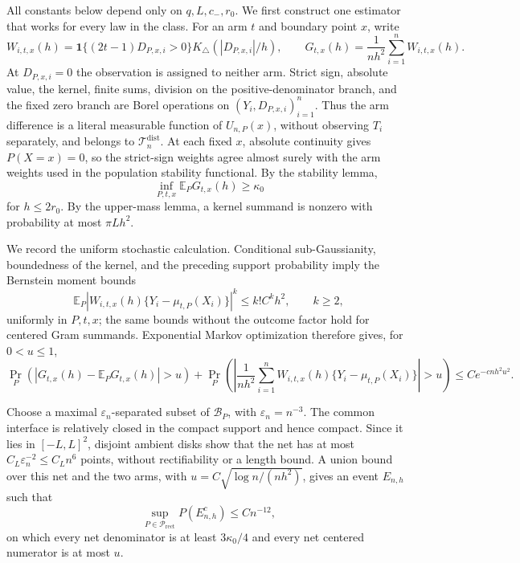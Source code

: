 All constants below depend only on \(q,L,c_-,r_0\).  We first construct one estimator that works for every law in the class.  For an arm \(t\) and boundary point \(x\), write
\[
W_{i,t,x}(h)=\mathbf1\{(2t-1)D_{P,x,i}>0\}
K_\triangle(|D_{P,x,i}|/h),
\qquad
G_{t,x}(h)=\frac1{nh^2}\sum_{i=1}^nW_{i,t,x}(h).
\]
At \(D_{P,x,i}=0\) the observation is assigned to neither arm.  Strict sign, absolute value, the kernel, finite sums, division on the positive-denominator branch, and the fixed zero branch are Borel operations on \((Y_i,D_{P,x,i})_{i=1}^n\).  Thus the arm difference is a literal measurable function of \(U_{n,P}(x)\), without observing \(T_i\) separately, and belongs to \(\mathcal T_n^{\mathrm{dist}}\).  At each fixed \(x\), absolute continuity gives \(P(X=x)=0\), so the strict-sign weights agree almost surely with the arm weights used in the population stability functional.  By the stability lemma,
\[
\inf_{P,t,x}\mathbb E_PG_{t,x}(h)\geq\kappa_0
\]
for \(h\leq2r_0\).  By the upper-mass lemma, a kernel summand is nonzero with probability at most \(\pi Lh^2\).

We record the uniform stochastic calculation.  Conditional sub-Gaussianity, boundedness of the kernel, and the preceding support probability imply the Bernstein moment bounds
\[
\mathbb E_P|W_{i,t,x}(h)\{Y_i-\mu_{t,P}(X_i)\}|^k
\leq k!C^k h^2,
\qquad k\geq2,
\]
uniformly in \(P,t,x\); the same bounds without the outcome factor hold for centered Gram summands.  Exponential Markov optimization therefore gives, for \(0<u\leq1\),
\[
\Pr_P\!\left(\left|G_{t,x}(h)-\mathbb E_PG_{t,x}(h)\right|>u\right)
+\Pr_P\!\left(\left|\frac1{nh^2}\sum_{i=1}^nW_{i,t,x}(h)
\{Y_i-\mu_{t,P}(X_i)\}\right|>u\right)
\leq C e^{-cnh^2u^2}.
\]

Choose a maximal \(\varepsilon_n\)-separated subset of \(\mathcal B_P\), with \(\varepsilon_n=n^{-3}\).  The common interface is relatively closed in the compact support and hence compact.  Since it lies in \([-L,L]^2\), disjoint ambient disks show that the net has at most \(C_L\varepsilon_n^{-2}\leq C_Ln^6\) points, without rectifiability or a length bound.  A union bound over this net and the two arms, with \(u=C\sqrt{\log n/(nh^2)}\), gives an event \(E_{n,h}\) such that
\[
\sup_{P\in\mathcal P_{\mathrm{rect}}}P(E_{n,h}^c)\leq Cn^{-12},
\]
on which every net denominator is at least \(3\kappa_0/4\) and every net centered numerator is at most \(u\).

